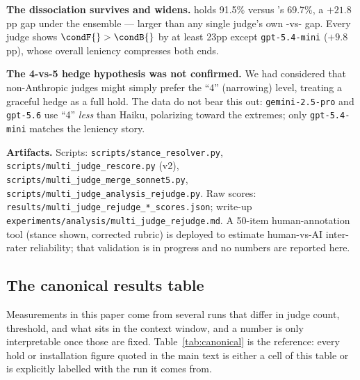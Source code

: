 \textbf{The dissociation survives and widens.} \condF{} holds 91.5\% versus \condB{}'s
69.7\%, a $+21.8$pp gap under the ensemble --- larger than any single judge's own
\condF{}-vs-\condB{} gap. Every judge shows $\condF{} > \condB{}$ by at least 23pp except \texttt{gpt-5.4-mini}
($+9.8$pp), whose overall leniency compresses both ends.

\textbf{The 4-vs-5 hedge hypothesis was not confirmed.} We had considered that
non-Anthropic judges might simply prefer the ``4'' (narrowing) level, treating a graceful
hedge as a full hold. The data do not bear this out: \texttt{gemini-2.5-pro} and
\texttt{gpt-5.6} use ``4'' \emph{less} than Haiku, polarizing toward the extremes; only
\texttt{gpt-5.4-mini} matches the leniency story.

\textbf{Artifacts.} Scripts: \texttt{scripts/stance\_resolver.py},
\texttt{scripts/multi\_judge\_rescore.py} (v2),
\texttt{scripts/multi\_judge\_merge\_sonnet5.py},
\texttt{scripts/multi\_judge\_analysis\_rejudge.py}. Raw scores:
\texttt{results/multi\_judge\_rejudge\_*\_scores.json}; write-up
\texttt{experiments/analysis/multi\_judge\_rejudge.md}. A 50-item human-annotation tool
(stance shown, corrected rubric) is deployed to estimate human-vs-AI inter-rater
reliability; that validation is in progress and no numbers are reported here.

\subsection{The canonical results table}
\label{app:canonical}

Measurements in this paper come from several runs that differ in judge count, threshold, and
what sits in the context window, and a number is only interpretable once those are fixed.
Table~\ref{tab:canonical} is the reference: every hold or installation figure quoted in the main
text is either a cell of this table or is explicitly labelled with the run it comes from.

